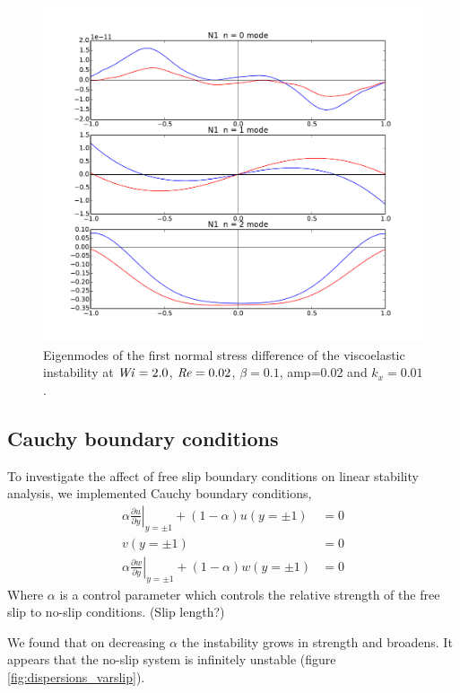 \documentclass{jfm}
\newcommand\Wi{\mbox{\textit{Wi}}}
\newcommand{\dy}[1]{\frac{\partial #1}{\partial y}}
\newcommand\Rey{\mbox{\textit{Re}}}  %
\begin{document}
\begin{figure}
    \centering
    \includegraphics[width=\textwidth]{./figures/eigenmode_visco}
    \caption{Eigenmodes of the first normal stress difference of the viscoelastic instability at $\Wi = 2.0$, $\Rey = 0.02$, $\beta=0.1$, amp=0.02 and $k_x = 0.01$.}
    \label{fig:eigenmode_visco}
\end{figure}

\subsection{Cauchy boundary conditions}

To investigate the affect of free slip boundary conditions on linear stability analysis, we implemented Cauchy boundary conditions,
\begin{align}
    \alpha\left.\dy{u}\right|_{y=\pm1} + (1-\alpha)u(y=\pm1) &= 0 \\
    v(y=\pm1) &=0 \\
    \alpha\left.\dy{w}\right|_{y=\pm1} + (1-\alpha)w(y=\pm1) &= 0 
\end{align}
Where $\alpha$ is a control parameter which controls the relative strength of the free slip to no-slip conditions. (Slip length?)

We found that on decreasing $\alpha$ the instability grows in strength and broadens. It appears that the no-slip system is infinitely unstable (figure \ref{fig:dispersions_varslip}).
\end{document}

